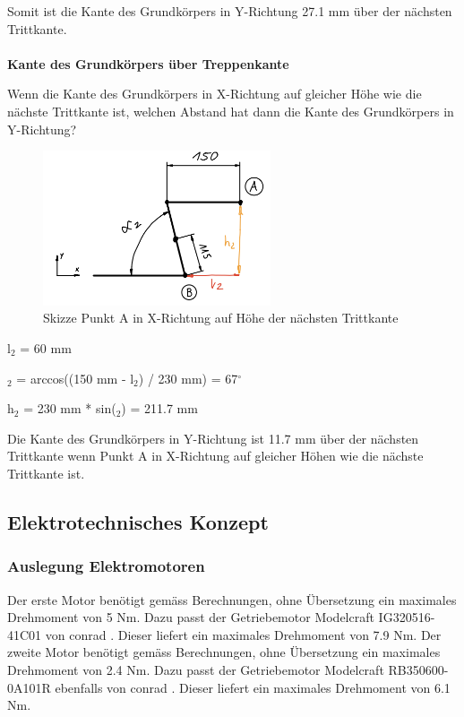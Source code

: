 Somit ist die Kante des Grundkörpers in Y-Richtung 27.1 mm über der nächsten Trittkante.\\
\\

\textbf{Kante des Grundkörpers über Treppenkante}

Wenn die Kante des Grundkörpers in X-Richtung auf gleicher Höhe wie die nächste Trittkante ist, welchen Abstand hat dann die Kante des Grundkörpers in Y-Richtung?\\

\begin{figure}[H]
  \includegraphics[width=0.6\textwidth]{img/Treppensteigen/Analyse 2.png}
  \centering
  \caption{Skizze Punkt A in X-Richtung auf Höhe der nächsten Trittkante}
\end{figure}

l$_{2}$ = 60 mm

\alpha$_{2}$ = arccos((150 mm - l$_{2}$) / 230 mm) = 67$^\circ$

h$_{2}$ = 230 mm * sin(\alpha$_{2}$)  = 211.7 mm

Die Kante des Grundkörpers in Y-Richtung ist 11.7 mm über der nächsten Trittkante wenn Punkt A in X-Richtung auf gleicher Höhen wie die nächste Trittkante ist.\\


\newpage
\subsection{Elektrotechnisches Konzept}
\subsubsection{Auslegung Elektromotoren}
Der erste Motor benötigt gemäss Berechnungen, ohne Übersetzung ein maximales Drehmoment von 5 Nm. Dazu passt der Getriebemotor Modelcraft IG320516-41C01 von conrad \cite{Getriebemotor1}. Dieser liefert ein maximales Drehmoment von 7.9 Nm. 
Der zweite Motor benötigt gemäss Berechnungen, ohne Übersetzung ein maximales Drehmoment von 2.4 Nm. Dazu passt der Getriebemotor Modelcraft RB350600-0A101R ebenfalls von conrad \cite{Getriebemotor2}. Dieser liefert ein maximales Drehmoment von 6.1 Nm.

